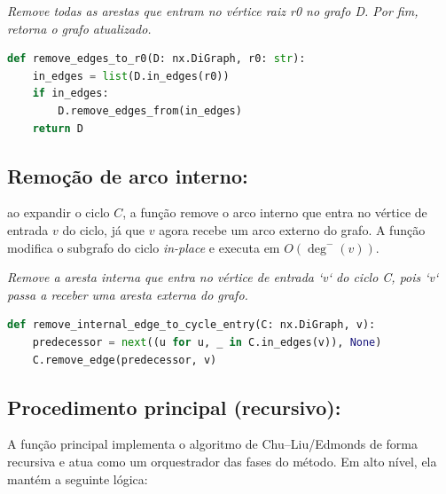\begin{tcolorbox}[
  enhanced, breakable,
  colframe=blue!60!black, colback=blue!2,
  colbacktitle=blue!15, coltitle=black,
  title={Remoção de arestas que entram na raiz},
  boxed title style={sharp corners, boxrule=0.6pt},
  sharp corners, boxrule=0.6pt
]
\emph{Remove todas as arestas que entram no vértice raiz r0 no grafo D. Por fim, retorna o grafo atualizado.}
\tcblower
\begin{lstlisting}[mathescape=true, language=Python]
def remove_edges_to_r0(D: nx.DiGraph, r0: str):
    in_edges = list(D.in_edges(r0))
    if in_edges:
        D.remove_edges_from(in_edges)
    return D
\end{lstlisting}
\end{tcolorbox}

\subsection{Remoção de arco interno:}
ao expandir o ciclo \(C\), a função remove o arco interno que entra no vértice de entrada \(v\) do ciclo, já que \(v\) agora recebe um arco externo do grafo. A função modifica o subgrafo do ciclo \emph{in-place} e executa em \(O(\deg^-(v))\).

\begin{tcolorbox}[
        enhanced, breakable,
        colframe=blue!60!black, colback=blue!2,
        colbacktitle=blue!15, coltitle=black,
        title={Remover arco interno na reexpansão},
        boxed title style={sharp corners, boxrule=0.6pt},
        sharp corners, boxrule=0.6pt
    ]
    \emph{Remove a aresta interna que entra no vértice de entrada `v` do ciclo C, pois `v` passa a receber uma aresta externa do grafo.}
    \tcblower
    \begin{lstlisting}[mathescape=true, language=Python]
def remove_internal_edge_to_cycle_entry(C: nx.DiGraph, v):
    predecessor = next((u for u, _ in C.in_edges(v)), None)
    C.remove_edge(predecessor, v) 
\end{lstlisting}
\end{tcolorbox}

\subsection{Procedimento principal (recursivo):}
A função principal implementa o algoritmo de Chu–Liu/Edmonds de forma recursiva e atua como um orquestrador das fases do método. Em alto nível, ela mantém a seguinte lógica:

